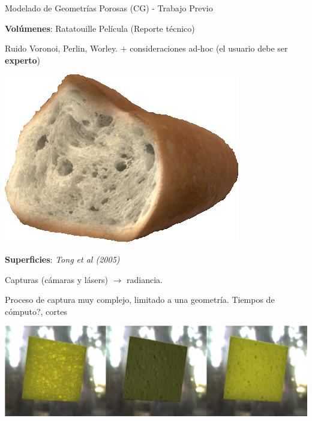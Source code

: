 \documentclass[spanish,unknownkeysallowed,10pt]{beamer}
\begin{document}
\begin{frame}{Modelado de Geometrías Porosas (CG) - Trabajo Previo}

\textbf{Volúmenes}: Ratatouille Película (Reporte técnico)

Ruido Voronoi, Perlin, Worley. $+$ consideraciones ad-hoc (el usuario debe ser \textbf{experto})

\centerline{\includegraphics[scale = 0.2]{../figures/ratatouille}}

\textbf{Superficies}: {\it Tong et al (2005)}

Capturas (cámaras y lásers) $\rightarrow$ radiancia.

Proceso de captura muy complejo, limitado a una geometría. Tiempos de cómputo?, cortes

\centerline{\includegraphics[scale = 0.2]{../figures/esponja}}

\end{frame}
\end{document}
